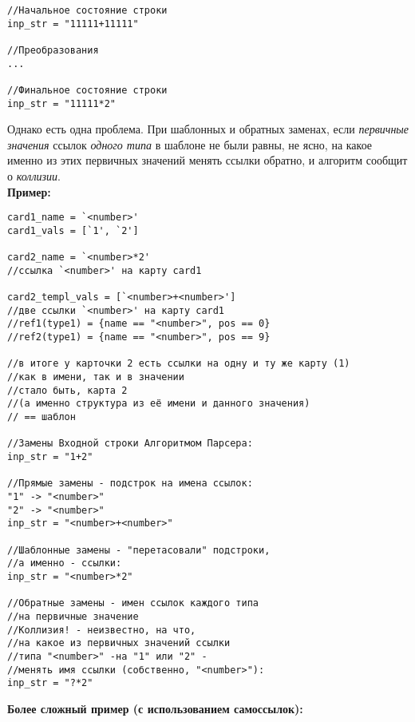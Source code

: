 \documentclass{book}
\begin{document}
\begin{verbatim}
//Начальное состояние строки
inp_str = "11111+11111"

//Преобразования
...

//Финальное состояние строки
inp_str = "11111*2"
\end{verbatim}

Однако есть одна проблема. При шаблонных и обратных заменах, если \textit{первичные значения} ссылок \textit{одного типа} в шаблоне не были равны, не ясно, на какое именно из этих первичных значений менять ссылки обратно, и алгоритм сообщит о \textit{коллизии}.\\

\textbf{Пример:}

\begin{verbatim}
card1_name = `<number>'
card1_vals = [`1', `2']

card2_name = `<number>*2' 
//ссылка `<number>' на карту card1

card2_templ_vals = [`<number>+<number>'] 
//две ссылки `<number>' на карту card1
//ref1(type1) = {name == "<number>", pos == 0}
//ref2(type1) = {name == "<number>", pos == 9}

//в итоге у карточки 2 есть ссылки на одну и ту же карту (1) 
//как в имени, так и в значении
//стало быть, карта 2 
//(а именно структура из её имени и данного значения) 
// == шаблон

//Замены Входной строки Алгоритмом Парсера:
inp_str = "1+2"

//Прямые замены - подстрок на имена ссылок:
"1" -> "<number>"
"2" -> "<number>"
inp_str = "<number>+<number>"

//Шаблонные замены - "перетасовали" подстроки, 
//а именно - ссылки:
inp_str = "<number>*2"

//Обратные замены - имен ссылок каждого типа
//на первичные значение
//Коллизия! - неизвестно, на что,
//на какое из первичных значений ссылки
//типа "<number>" -на "1" или "2" - 
//менять имя ссылки (собственно, "<number>"):
inp_str = "?*2"
\end{verbatim}

\textbf{Более сложный пример (с использованием самоссылок):}
\end{document}
